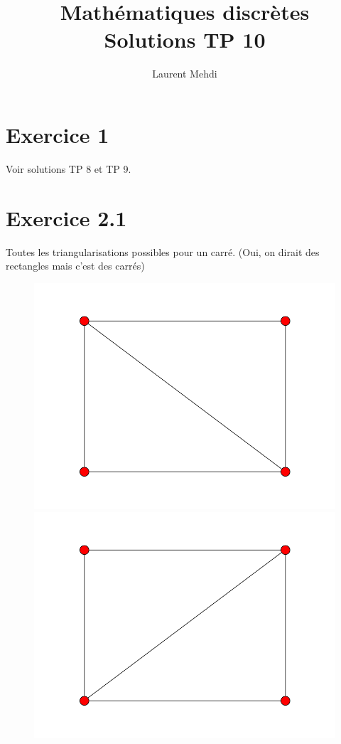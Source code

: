 \documentclass[fontsize=10pt]{article}
\title{\textbf{Mathématiques discrètes}\\ Solutions TP 10}
\author{Laurent Mehdi}
\date{}
\begin{document}
\maketitle

\section*{Exercice 1}
Voir solutions TP 8 et TP 9.

\section*{Exercice 2.1}
Toutes les triangularisations possibles pour un carré. (Oui, on dirait des rectangles mais c'est des carrés)
\begin{figure}[hbtp]
\centering
\includegraphics[scale=0.5]{imgs/carre/carre_1.png}
\includegraphics[scale=0.5]{imgs/carre/carre_2.png}
\end{figure}
\end{document}
